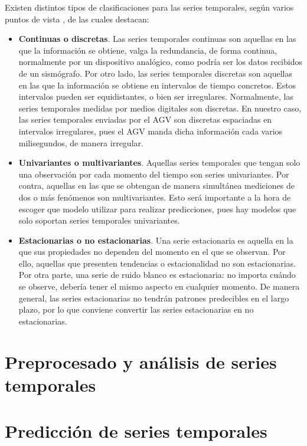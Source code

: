 Existen distintos tipos de clasificaciones para las series temporales, según varios puntos de vista \cite{kitagawa2010introduction}, de
las cuales destacan:
\begin{itemize}
    \item \textbf{Continuas o discretas}. Las series temporales continuas son aquellas en las que la información se obtiene, valga la redundancia,
        de forma continua, normalmente por un dispositivo analógico, como podría ser los datos recibidos de un sismógrafo. Por otro lado,
        las series temporales discretas son aquellas en las que la información se obtiene en intervalos de tiempo concretos. Estos intervalos 
        pueden ser equidistantes, o bien ser irregulares. Normalmente, las series temporales medidas por medios digitales son discretas.
        En nuestro caso, las series temporales enviadas por el AGV son discretas espaciadas en intervalos irregulares, pues el AGV manda dicha
        información cada varios milisegundos, de manera irregular.
    \item \textbf{Univariantes o multivariantes}. Aquellas series temporales que tengan solo una observación por cada momento del tiempo son series
        univariantes. Por contra, aquellas en las que se obtengan de manera simultánea mediciones de dos o más fenómenos son multivariantes.
        Esto será importante a la hora de escoger que modelo utilizar para realizar predicciones, pues hay modelos que solo soportan series
        temporales univariantes.
    \item \textbf{Estacionarias o no estacionarias}. Una serie estacionaria \cite{hyndman2018forecasting} es aquella en la que sus propiedades no dependen del momento
        en el que se observan. Por ello, aquellas que presenten tendencias o estacionalidad no son estacionarias. Por otra parte, una serie de 
        ruido blanco es estacionaria: no importa cuándo se observe, debería tener el mismo aspecto en cualquier momento. De manera general, las
        series estacionarias no tendrán patrones predecibles en el largo plazo, por lo que conviene convertir las series estacionarias en no
        estacionarias.
\end{itemize}

\section{Preprocesado y análisis de series temporales}

\section{Predicción de series temporales}